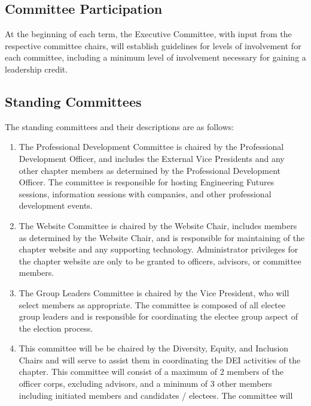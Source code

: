 \subsection{Committee Participation} \label{G.1}

At the beginning of each term, the Executive
Committee, with input from the respective committee chairs, will establish guidelines
for levels of involvement for each committee, including a minimum level of involvement
necessary for gaining a leadership credit.


\subsection{Standing Committees} \label{G.2}

The standing committees and their descriptions are as follows:
\begin{enumerate}
    \item {}
    The Professional Development Committee
is chaired by the Professional Development Officer, and includes the External
Vice Presidents and any other chapter members as determined by the Professional
Development Officer. The committee is responsible for hosting Engineering Futures
sessions, information sessions with companies, and other professional development
events.
    \item {}
    The Website Committee is chaired by the Website Chair, includes
members as determined by the Website Chair, and is responsible for maintaining
of the chapter website and any supporting technology. Administrator privileges
for the chapter website are only to be granted to officers, advisors, or committee
members.
    \item {}
    The Group Leaders Committee is chaired by the Vice
President, who will select members as appropriate. The committee is composed of
all electee group leaders and is responsible for coordinating the electee group aspect
of the election process.
    \item {}
    This committee will be be
chaired by the Diversity, Equity, and Inclusion Chairs and will serve to assist them in
coordinating the DEI activities of the chapter. This committee will consist of a maximum
of 2 members of the officer corps, excluding advisors, and a minimum of 3 other
members including initiated members and candidates / electees. The committee will

\end{enumerate}
